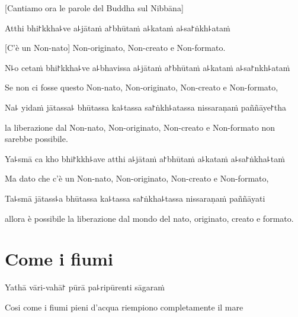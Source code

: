 \begin{english}
  [Cantiamo ora le parole del Buddha sul Nibbāna]
\end{english}


Atthi bhi꜓kkha꜕ve a꜕jātaṁ a꜓bhūtaṁ a꜕kataṁ a꜕sa꜓ṅkh꜕ataṁ

\begin{english}
[C'è un Non-nato] Non-originato, Non-creato e Non-formato.
\end{english}

N꜕o cetaṁ bhi꜓kkha꜕ve a꜕bhavissa a꜕jātaṁ a꜓bhūtaṁ a꜕kataṁ a꜕sa꜓nkh꜕ataṁ

\begin{english}
Se non ci fosse questo Non-nato, Non-originato, Non-creato e Non-formato,
\end{english}

Na꜕ yidaṁ jātassa꜕ bhūtassa ka꜕tassa sa꜓ṅkh꜕atassa nissaraṇaṁ paññāye꜓tha

\begin{english}
la liberazione dal Non-nato, Non-originato, Non-creato e Non-formato non sarebbe possibile.
\end{english}

Ya꜕smā ca kho bhi꜓kkh꜕ave atthi a꜕jātaṁ a꜓bhūtaṁ a꜕kataṁ a꜕sa꜓ṅkha꜕taṁ

\begin{english}
Ma dato che c'è un Non-nato, Non-originato, Non-creato e Non-formato,
\end{english}

Ta꜕smā jātass꜕a bhūtassa ka꜕tassa sa꜓ṅkha꜕tassa nissaraṇaṁ paññāyati

\begin{english}
allora è possibile la liberazione dal mondo del nato, originato, creato e formato.
\end{english}

\clearpage

\chapter[Come i fiumi]{Come i fiumi}


Yathā vāri-vahā꜓ pūrā pa꜕ripūrenti sāgaraṁ


\begin{english}
Cosi  come i fiumi pieni d'acqua riempiono completamente il mare
\end{english}

